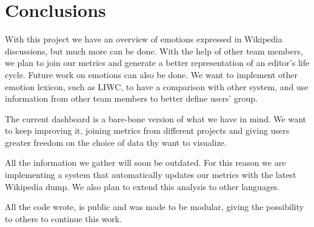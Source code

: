 \chapter{Conclusions}

With this project we have an overview of emotions expressed in Wikipedia discussions, but much more can be done. With the help of other team members, we plan to join our metrics and generate a better representation of an editor's life cycle. Future work on emotions can also be done. We want to implement other emotion lexicon, such as LIWC, to have a comparison with other system, and use information from other team members to better define users' group.

The current dashboard is a bare-bone version of what we have in mind. We want to keep improving it, joining metrics from different projects and giving users greater freedom on the choice of data thy want to visualize.

All the information we gather will soon be outdated. For this reason we are implementing a system that automatically updates our metrics with the latest Wikipedia dump. We also plan to extend this analysis to other languages.

All the code wrote, is public and was made to be modular, giving the possibility to others to continue this work.
